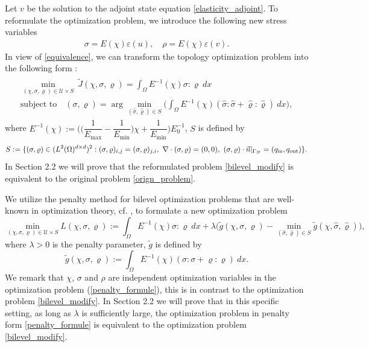 \documentclass{amsart}
\begin{document}
Let $v$ be the solution to the adjoint state equation \eqref{elasticity_adjoint}. To reformulate the optimization problem, we introduce the following new stress variables
\begin{eqnarray}
\sigma=E(\chi)\varepsilon(u), \quad\rho=E(\chi)\varepsilon(v).\nonumber
\end{eqnarray}
In view of \eqref{equivalence}, we can transform the topology optimization problem into the following form \cite{CHEN202311891216}: 
\begin{align}\label{bilevel_modify}
\begin{split}
    \min\limits_{(\chi,\sigma,\varrho)\in \mathcal{U}\times S}\ \tilde{J}(\chi,\sigma,\varrho)=\int_{\Omega}E^{-1}(\chi)\sigma:\varrho\ dx\\
    \mbox{subject\ to}\quad (\sigma,\varrho)=\arg\min_{(\hat\sigma,\hat\varrho)\in S}\Big(\int_{\Omega}E^{-1}(\chi)(\hat\sigma:\hat\sigma+\hat\varrho:\hat\varrho)\ dx\Big),
\end{split}
\end{align}
where $E^{-1}(\chi):=\Big(\Big(\dfrac{1}{E_{\max}}-\dfrac{1}{E_{\min}}\Big)\chi+\dfrac{1}{E_{\min}}\Big)E_0^{-1}$, $S$ is defined by
\begin{equation}
    S:=\{(\sigma,\varrho)\in (L^2(\Omega)^{d\times d})^2:(\sigma,\varrho)_{i,j}=(\sigma,\varrho)_{j,i},\ \nabla\cdot(\sigma,\varrho)=(0,0),\ (\sigma,\varrho)\cdot\vec{n}|_{\Gamma_N}=(q_{\rm in},q_{\rm out})\}.\nonumber
\end{equation}
In Section 2.2 we will prove that the reformulated problem \eqref{bilevel_modify} is equivalent to the original problem \eqref{orign_problem}.

We utilize the penalty method for bilevel optimization problems that are well-known in optimization theory, cf. \cite{ChenMa2025}, to formulate a new optimization problem
\begin{equation}\label{penalty_formule}
    \min_{(\chi,\sigma,\varrho)\in \mathcal{U}\times S}   L(\chi,\sigma,\varrho):=\int_{\Omega}E^{-1}(\chi)\sigma:\varrho\ dx + \lambda\Big( \tilde{g}(\chi,\sigma,\varrho)-\min_{(\hat{\sigma},\hat{\varrho})\in S} \tilde{g}(\chi,\hat{\sigma},\hat{\varrho})\Big),
\end{equation}
where \(\lambda>0\) is the penalty parameter, $\tilde{g}$ is defined by
$$\tilde{g}(\chi,\sigma,\varrho):=\int_{\Omega}E^{-1}(\chi)(\sigma:\sigma+\varrho:\varrho)\ dx.$$
We remark that $\chi$, $\sigma$ and $\rho$ are independent optimization variables in the optimization problem (\ref{penalty_formule}), this is in contrast to the optimization problem \eqref{bilevel_modify}. In Section 2.2 we will prove that in this specific setting, as long as \(\lambda\) is sufficiently large, the optimization problem in penalty form \eqref{penalty_formule} is equivalent to the optimization problem \eqref{bilevel_modify}.
\end{document}
